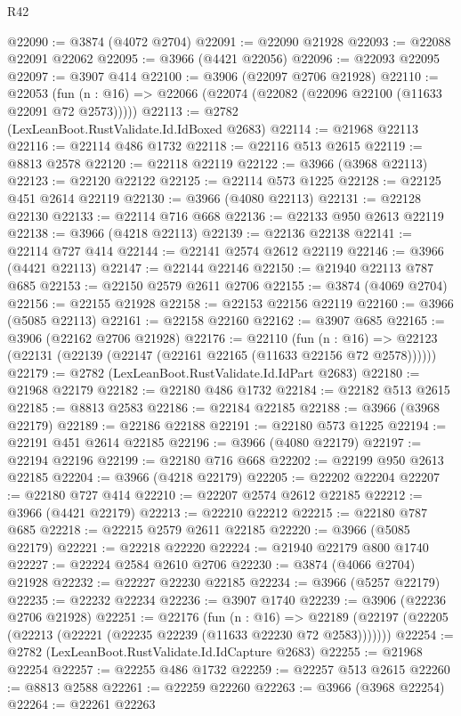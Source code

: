 \begin{lexlean}{R42}
\begin{coremodule}
@22090 := @3874 (@4072 @2704)
@22091 := @22090 @21928
@22093 := @22088 @22091 @22062
@22095 := @3966 (@4421 @22056)
@22096 := @22093 @22095
@22097 := @3907 @414
@22100 := @3906 (@22097 @2706 @21928)
@22110 := @22053
    (fun (n : @16) => @22066 (@22074 (@22082 (@22096 @22100 (@11633 @22091 @72 @2573)))))
@22113 := @2782 (LexLeanBoot.RustValidate.Id.IdBoxed @2683)
@22114 := @21968 @22113
@22116 := @22114 @486 @1732
@22118 := @22116 @513 @2615
@22119 := @8813 @2578
@22120 := @22118 @22119
@22122 := @3966 (@3968 @22113)
@22123 := @22120 @22122
@22125 := @22114 @573 @1225
@22128 := @22125 @451 @2614 @22119
@22130 := @3966 (@4080 @22113)
@22131 := @22128 @22130
@22133 := @22114 @716 @668
@22136 := @22133 @950 @2613 @22119
@22138 := @3966 (@4218 @22113)
@22139 := @22136 @22138
@22141 := @22114 @727 @414
@22144 := @22141 @2574 @2612 @22119
@22146 := @3966 (@4421 @22113)
@22147 := @22144 @22146
@22150 := @21940 @22113 @787 @685
@22153 := @22150 @2579 @2611 @2706
@22155 := @3874 (@4069 @2704)
@22156 := @22155 @21928
@22158 := @22153 @22156 @22119
@22160 := @3966 (@5085 @22113)
@22161 := @22158 @22160
@22162 := @3907 @685
@22165 := @3906 (@22162 @2706 @21928)
@22176 := @22110
    (fun (n : @16) => @22123 (@22131 (@22139 (@22147 (@22161 @22165 (@11633 @22156 @72 @2578))))))
@22179 := @2782 (LexLeanBoot.RustValidate.Id.IdPart @2683)
@22180 := @21968 @22179
@22182 := @22180 @486 @1732
@22184 := @22182 @513 @2615
@22185 := @8813 @2583
@22186 := @22184 @22185
@22188 := @3966 (@3968 @22179)
@22189 := @22186 @22188
@22191 := @22180 @573 @1225
@22194 := @22191 @451 @2614 @22185
@22196 := @3966 (@4080 @22179)
@22197 := @22194 @22196
@22199 := @22180 @716 @668
@22202 := @22199 @950 @2613 @22185
@22204 := @3966 (@4218 @22179)
@22205 := @22202 @22204
@22207 := @22180 @727 @414
@22210 := @22207 @2574 @2612 @22185
@22212 := @3966 (@4421 @22179)
@22213 := @22210 @22212
@22215 := @22180 @787 @685
@22218 := @22215 @2579 @2611 @22185
@22220 := @3966 (@5085 @22179)
@22221 := @22218 @22220
@22224 := @21940 @22179 @800 @1740
@22227 := @22224 @2584 @2610 @2706
@22230 := @3874 (@4066 @2704) @21928
@22232 := @22227 @22230 @22185
@22234 := @3966 (@5257 @22179)
@22235 := @22232 @22234
@22236 := @3907 @1740
@22239 := @3906 (@22236 @2706 @21928)
@22251 := @22176
    (fun (n : @16) =>
    @22189 (@22197 (@22205 (@22213 (@22221 (@22235 @22239 (@11633 @22230 @72 @2583)))))))
@22254 := @2782 (LexLeanBoot.RustValidate.Id.IdCapture @2683)
@22255 := @21968 @22254
@22257 := @22255 @486 @1732
@22259 := @22257 @513 @2615
@22260 := @8813 @2588
@22261 := @22259 @22260
@22263 := @3966 (@3968 @22254)
@22264 := @22261 @22263

\end{coremodule}
\end{lexlean}
